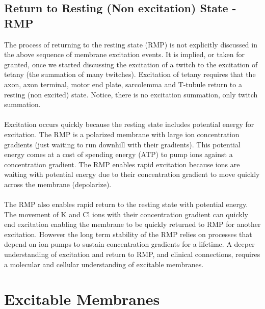 \subsection{Return to Resting (Non excitation) State - RMP}
The process of returning to the resting state (RMP) is not explicitly discussed in the above sequence of membrane excitation events. It is implied, or taken for granted, once we started discussing the excitation of a twitch to the excitation of tetany (the summation of many twitches). Excitation of tetany requires that the axon, axon terminal, motor end plate, sarcolemma and T-tubule return to a resting (non excited) state. Notice, there is no excitation summation, only twitch summation.
\paragraph{}
Excitation occurs quickly because the resting state includes potential energy for excitation. The RMP is a polarized membrane with large ion concentration gradients (just waiting to run downhill with their gradients). This potential energy comes at a cost of spending energy (ATP) to pump ions against a concentration gradient. The RMP enables rapid excitation because ions are waiting with potential energy due to their concentration gradient to move quickly across the membrane (depolarize). 
\paragraph{}
The RMP also enables rapid return to the resting state with potential energy. The movement of K and Cl ions with their concentration gradient can quickly end excitation enabling the membrane to be quickly returned to RMP for another excitation. However the long term stability of the RMP relies on processes that depend on ion pumps to sustain concentration gradients for a lifetime.\footnotemark{}
A deeper understanding of excitation and return to RMP, and clinical connections, requires a molecular and cellular understanding of excitable membranes.


\section{Excitable Membranes}

